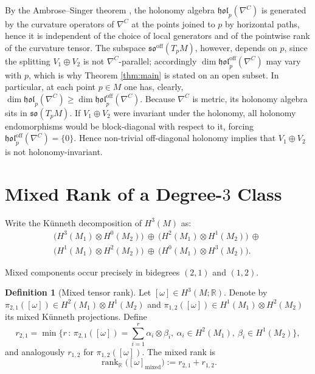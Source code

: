 \documentclass[11pt,reqno]{amsart}
\theoremstyle{plain}
\theoremstyle{definition}
\newtheorem{definition}[theorem]{Definition}
\numberwithin{equation}{section}
\begin{document}
By the Ambrose--Singer theorem \cite{A-S (1953)}, the holonomy algebra $\mathfrak{hol}_p(\nabla^C)$ is generated by the curvature operators of $\nabla^C$ at the points joined to $p$ by horizontal paths, hence it is independent of the choice of local generators and of the pointwise rank of the curvature tensor. The subspace $\mathfrak{so}^{\mathrm{off}}(T_pM)$, however, depends on $p$, since the splitting $V_1\oplus V_2$ is not $\nabla^{C}$-parallel; accordingly $\dim\mathfrak{hol}^{\mathrm{off}}_p(\nabla^C)$
may vary with $p$, which is why Theorem \ref{thm:main} is stated on an open subset. In particular, at each point $p\in M$ one has, clearly, $\dim\mathfrak{hol}_p(\nabla^C)\ge \dim\mathfrak{hol}_p^{\mathrm{off}}(\nabla^C)$. Because $\nabla^C$ is metric, its holonomy algebra sits in $\mathfrak{so}(T_pM)$. If $V_1\oplus V_2$ were invariant under the holonomy, all holonomy endomorphisms would be block-diagonal with respect to it, forcing $\mathfrak{hol}_p^{\mathrm{off}}(\nabla^C)=\{0\}$. Hence non-trivial off-diagonal holonomy implies that $V_1\oplus V_2$ is not holonomy-invariant.

\section{Mixed Rank of a Degree-\texorpdfstring{$3$}{3} Class}

Write the K\"unneth decomposition of \(H^3(M)\) as:
\begin{equation}
\begin{aligned}
\big(H^3(M_1)\otimes H^0(M_2)\big)\ \oplus\ \big(H^2(M_1)\otimes H^1(M_2)\big)\ \oplus\ \\
\big(H^1(M_1)\otimes H^2(M_2)\big)\ \oplus\ \big(H^0(M_1)\otimes H^3(M_2)\big).
\end{aligned}
\end{equation}

Mixed components occur precisely in bidegrees \((2,1)\) and \((1,2)\).

\begin{definition}[Mixed tensor rank]\label{def:mixed-rank}
Let \([\omega]\in H^3(M;\mathbb{R})\). Denote by \(\pi_{2,1}([\omega])\in H^2(M_1)\otimes H^1(M_2)\) and \(\pi_{1,2}([\omega])\in H^1(M_1)\otimes H^2(M_2)\) its mixed K\"unneth projections. Define
\begin{equation}
r_{2,1} = \min\Big\{ r \,:\, \pi_{2,1}([\omega])=\sum_{i=1}^r \alpha_i\otimes \beta_i,\ \alpha_i\in H^2(M_1),\ \beta_i\in H^1(M_2)\Big\},
\end{equation}
and analogously \(r_{1,2}\) for \(\pi_{1,2}([\omega])\). The mixed rank is
\begin{equation}
\operatorname{rank}_\mathbb{R}\big([\omega]_{\mathrm{mixed}}\big):= r_{2,1}+r_{1,2}.
\end{equation}
\end{definition}
\end{document}
